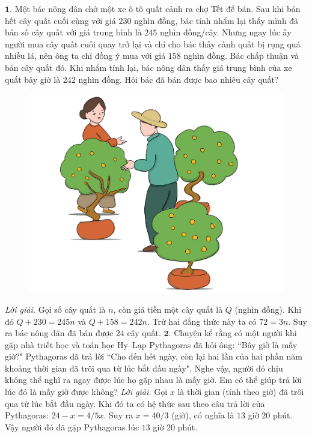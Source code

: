 \centering
\endgroup
\vspace*{55pt}

\begin{multicols}{2}
	$\pmb{1.}$ Một bác nông dân chở một xe ô tô quất cảnh ra chợ Tết để bán. Sau khi bán hết cây quất cuối cùng với giá $230$ nghìn đồng, bác tính nhẩm lại thấy mình đã bán số cây quất với giá trung bình là $245$ nghìn đồng/cây. Nhưng ngay lúc ấy người mua cây quất cuối quay trở lại và chỉ cho bác thấy cành quất bị rụng quá nhiều lá, nên ông ta chỉ đồng ý mua với giá $158$ nghìn đồng. 
	Bác chấp thuận và bán cây quất đó. Khi nhẩm tính lại, bác nông dân thấy giá trung bình của xe quất bây giờ là $242$ nghìn đồng. Hỏi bác đã bán được bao nhiêu cây quất?
	\begin{figure}[H]
		\centering
		\vspace*{-10pt}
		\captionsetup{labelformat= empty, justification=centering}
		\includegraphics[width=0.7\linewidth]{Pi1_2_Bai1}
		\vspace*{-15pt}
	\end{figure}
	\textit{Lời giải.} Gọi số cây quất là $n$, còn giá tiền một cây quất là $Q$ (nghìn đồng). Khi đó $Q+230 = 245n$ và $Q+ 158 = 242n$. Trừ hai đẳng thức này ta có $72 = 3n$. Suy ra bác nông dân đã bán được $24$ cây quất.
	\vskip 0.1cm
	$\pmb{2.}$ Chuyện kể rằng có một người khi gặp nhà triết học và toán học Hy--Lạp Pythagoras đã hỏi ông: ``Bây giờ là mấy giờ?" Pythagoras đã trả lời ``Cho đến hết ngày, còn lại hai lần của hai phần năm khoảng thời gian đã trôi qua từ lúc bắt đầu ngày". Nghe vậy, người đó chịu không thể nghĩ ra ngay được lúc họ gặp nhau là mấy giờ. Em có thể giúp trả lời lúc đó là mấy giờ được không?
	\vskip 0.1cm
	\textit{Lời giải.} 	Gọi $x$ là thời gian (tính theo giờ) đã trôi qua từ lúc bắt đầu ngày. Khi đó ta có hệ thức sau theo câu trả lời của Pythagoras: $24 - x = 4/5 x$. Suy ra $x = 40/3$ (giờ), có nghĩa là $13$ giờ $20$ phút. Vậy người đó đã gặp Pythagoras lúc $13$ giờ $20$ phút.

\end{multicols}
